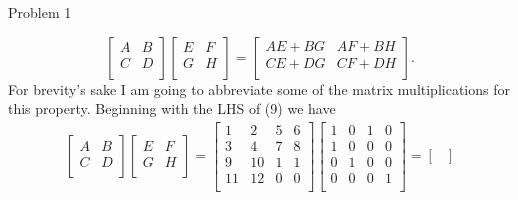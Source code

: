 \begin{problem}{Problem 1}
\begin{Highlight}[Solution]
        \begin{equation}
            \begin{bmatrix}
                A & B \\
                C & D \\
            \end{bmatrix}
            \begin{bmatrix}
                E & F \\
                G & H \\
            \end{bmatrix}
            = 
            \begin{bmatrix}
                AE + BG & AF + BH \\
                CE + DG & CF + DH \\
            \end{bmatrix}.
        \end{equation}
        For brevity's sake I am going to abbreviate some of the matrix multiplications for this property. Beginning with the LHS of (9) we have
        \begin{align*}
            \begin{bmatrix}
                A & B \\
                C & D \\
            \end{bmatrix}
            \begin{bmatrix}
                E & F \\
                G & H \\
            \end{bmatrix}
            = 
            \begin{bmatrix}
                1 & 2 & 5 & 6 \\
                3 & 4 & 7 & 8 \\
                9 & 10 & 1 & 1 \\
                11 & 12 & 0 & 0 \\
            \end{bmatrix}
            \begin{bmatrix}
                1 & 0 & 1 & 0 \\
                1 & 0 & 0 & 0 \\
                0 & 1 & 0 & 0 \\
                0 & 0 & 0 & 1 \\
            \end{bmatrix}
            = 
            \begin{bmatrix}

\end{bmatrix}
\end{align*}
\end{Highlight}
\end{problem}
